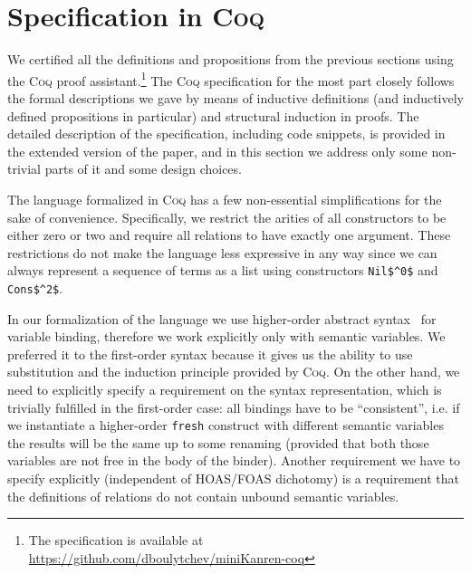 \section{Specification in \textsc{Coq}}
\label{specification}

We certified all the definitions and propositions from the previous sections using the \textsc{Coq} proof assistant.\footnote{The specification is available at \url{https://github.com/dboulytchev/miniKanren-coq}} The \textsc{Coq} specification for the most part closely follows the formal descriptions we gave by means of inductive definitions (and inductively defined propositions in particular) and structural induction in proofs. The detailed description of the specification, including code snippets, is provided in the extended version of the paper, and in this section we address only some non-trivial parts of it and some design choices.

The language formalized in \textsc{Coq} has a few non-essential simplifications for the sake of convenience. Specifically, we restrict the arities of all constructors to be either zero or two and require all relations to have exactly one argument. These restrictions do not make the language less expressive in any way since we can always represent a sequence of terms as a list using constructors \lstinline|Nil$^0$| and \lstinline|Cons$^2$|. 

In our formalization of the language we use higher-order abstract syntax~\cite{HOAS} for variable binding, therefore we work explicitly only with semantic variables. We preferred it to the first-order syntax because it gives us the ability to use substitution and the induction principle provided by \textsc{Coq}. On the other hand, we need to explicitly specify a requirement on the syntax representation, which is trivially fulfilled in the first-order case: all bindings have to be ``consistent'', i.e. if we instantiate a higher-order \lstinline|fresh| construct with different semantic variables the results will be the same up to some renaming (provided that both those variables are not free in the body of the binder). Another requirement we have to specify explicitly (independent of HOAS/FOAS dichotomy) is a requirement that the definitions of relations do not contain unbound semantic variables.

